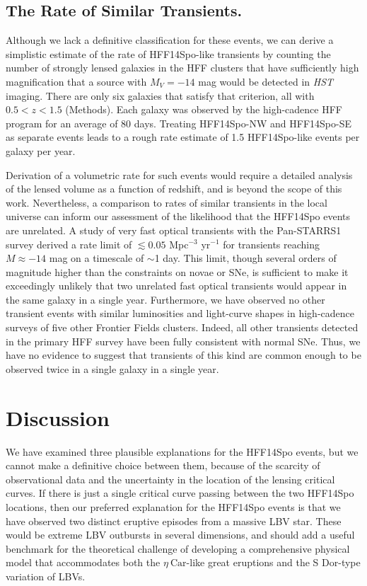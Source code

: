 \documentclass{article}
\providecommand\citet{\cite}
\def\etacar{\ensuremath{\eta~\mbox{Car}}\xspace}
\def\HST{{\it HST}\xspace}
\def\spock{HFF14Spo\xspace}
\def\spockone{HFF14Spo-NW\xspace}
\def\spocktwo{HFF14Spo-SE\xspace}
\begin{document}
\subsection{The Rate of Similar Transients.}\label{sec:Rates}

Although we lack a definitive classification for these events, we can
derive a simplistic estimate of the rate of \spock-like transients by
counting the number of strongly lensed galaxies in the HFF clusters
that have sufficiently high magnification that a source with
$M_{V}=-14$ mag would be detected in \HST imaging. There are only six
galaxies that satisfy that criterion, all with $0.5<z<1.5$
(Methods).  Each galaxy was observed by the high-cadence HFF program
for an average of 80 days.  Treating \spockone and \spocktwo as
separate events leads to a rough rate estimate of 1.5 \spock-like
events per galaxy per year.

Derivation of a volumetric rate for such events would require a
detailed analysis of the lensed volume as a function of redshift, and
is beyond the scope of this work. Nevertheless, a comparison to rates
of similar transients in the local universe can inform our assessment
of the likelihood that the \spock events are unrelated.  A study of
very fast optical transients with the Pan-STARRS1 survey derived a
rate limit of $\lesssim0.05$ Mpc$^{-3}$ yr$^{-1}$ for transients
reaching $M\approx -14$ mag on a timescale of $\sim$1
day\citet{Berger:2013b}.  This limit, though several orders of
magnitude higher than the constraints on novae or SNe, is sufficient
to make it exceedingly unlikely that two unrelated fast optical
transients would appear in the same galaxy in a single year.
Furthermore, we have observed no other transient events with similar
luminosities and light-curve shapes in high-cadence surveys of five
other Frontier Fields clusters. Indeed, all other transients detected
in the primary HFF survey have been fully consistent with normal SNe.
Thus, we have no evidence to suggest that transients of this kind are
common enough to be observed twice in a single galaxy in a single
year.


\section{Discussion}\label{sec:Discussion}

We have examined three plausible explanations for the \spock events,
but we cannot make a definitive choice between them, because of the
scarcity of observational data and the uncertainty in the location of
the lensing critical curves. If there is just a single critical curve
passing between the two \spock locations, then
our preferred explanation for the \spock events is that we have
observed two distinct eruptive episodes from a massive LBV star. These
would be extreme LBV outbursts in several dimensions, and should add a
useful benchmark for the theoretical challenge of developing a
comprehensive physical model that accommodates both the \etacar-like
great eruptions and the S Dor-type variation of LBVs.
\end{document}
